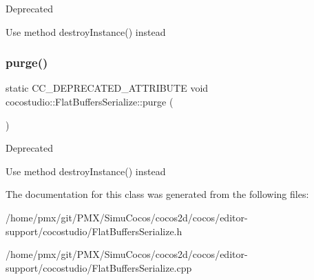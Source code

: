 \begin{DoxyRefDesc}{Deprecated}
\item[\hyperlink{deprecated__deprecated000082}{Deprecated}]Use method destroy\+Instance() instead \end{DoxyRefDesc}
\mbox{\label{classcocostudio_1_1FlatBuffersSerialize_a3f15e475b6ff17343f4b7acf75d503b5}} 
\subsubsection{\texorpdfstring{purge()}{purge()}\hspace{0.1cm}{\footnotesize\ttfamily [2/2]}}
{\footnotesize\ttfamily static C\+C\+\_\+\+D\+E\+P\+R\+E\+C\+A\+T\+E\+D\+\_\+\+A\+T\+T\+R\+I\+B\+U\+TE void cocostudio\+::\+Flat\+Buffers\+Serialize\+::purge (\begin{DoxyParamCaption}{ }\end{DoxyParamCaption})\hspace{0.3cm}{\ttfamily [static]}}

\begin{DoxyRefDesc}{Deprecated}
\item[\hyperlink{deprecated__deprecated000317}{Deprecated}]Use method destroy\+Instance() instead \end{DoxyRefDesc}


The documentation for this class was generated from the following files\+:\begin{DoxyCompactItemize}
\item 
/home/pmx/git/\+P\+M\+X/\+Simu\+Cocos/cocos2d/cocos/editor-\/support/cocostudio/Flat\+Buffers\+Serialize.\+h\item 
/home/pmx/git/\+P\+M\+X/\+Simu\+Cocos/cocos2d/cocos/editor-\/support/cocostudio/Flat\+Buffers\+Serialize.\+cpp\end{DoxyCompactItemize}
